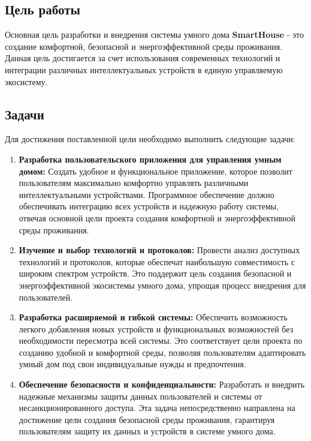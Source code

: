\documentclass{article}
\begin{document}
\subsection{Цель работы}

Основная цель разработки и внедрения системы умного дома \textbf{SmartHouse} - это создание комфортной, безопасной и энергоэффективной среды проживания. Данная цель достигается за счет использования современных технологий и интеграции различных интеллектуальных устройств в единую управляемую экосистему.

\subsection{Задачи}
Для достижения поставленной цели необходимо выполнить следующие задачи:

\begin{enumerate}
    
    \item \textbf{Разработка пользовательского приложения для управления умным домом:} Создать удобное и функциональное приложение, которое позволит пользователям максимально комфортно управлять различными интеллектуальными устройствами. Программное обеспечение должно обеспечивать интеграцию всех устройств и надежную работу системы, отвечая основной цели проекта создания комфортной и энергоэффективной среды проживания.

    \item \textbf{Изучение и выбор технологий и протоколов:} Провести анализ доступных технологий и протоколов, которые обеспечат наибольшую совместимость с широким спектром устройств. Это поддержит цель создания безопасной и энергоэффективной экосистемы умного дома, упрощая процесс внедрения для пользователей.

    \item \textbf{Разработка расширяемой и гибкой системы:} Обеспечить возможность легкого добавления новых устройств и функциональных возможностей без необходимости пересмотра всей системы. Это соответствует цели проекта по созданию удобной и комфортной среды, позволяя пользователям адаптировать умный дом под свои индивидуальные нужды и предпочтения.

    \item \textbf{Обеспечение безопасности и конфиденциальности:} Разработать и внедрить надежные механизмы защиты данных пользователей и системы от несанкционированного доступа. Эта задача непосредственно направлена на достижение цели создания безопасной среды проживания, гарантируя пользователям защиту их данных и устройств в системе умного дома.
\end{enumerate}
\end{document}
